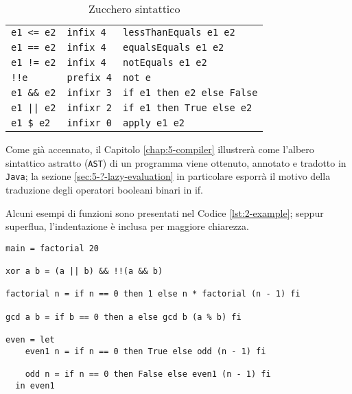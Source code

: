 \begin{table}[H]
\begin{center}
\begin{tabularx}{\textwidth}{|P{7em}@{\quad}P{7em}|X|}
            \texttt{e1 <= e2}            & \texttt{infix 4}  & \texttt{lessThanEquals e1 e2}     \\
            \texttt{e1 == e2}            & \texttt{infix 4}  & \texttt{equalsEquals e1 e2}       \\
            \texttt{e1 != e2}            & \texttt{infix 4}  & \texttt{notEquals e1 e2}          \\
            \texttt{!!e}                 & \texttt{prefix 4} & \texttt{not e}                    \\
            \texttt{e1 \&\& e2}          & \texttt{infixr 3} & \texttt{if e1 then e2 else False} \\
            \texttt{e1 || e2}            & \texttt{infixr 2} & \texttt{if e1 then True else e2}  \\
            \texttt{e1 \$ e2}            & \texttt{infixr 0} & \texttt{apply e1 e2}              \\
            \hline
        \end{tabularx}
    \end{center}
    \caption{Zucchero sintattico}
    \label{tab:2-sugar}
\end{table}

\newpage

\noindent Come già accennato, il Capitolo \ref{chap:5-compiler} illustrerà come l'albero sintattico astratto (\texttt{AST})
di un programma viene ottenuto, annotato e tradotto in \texttt{Java}; la sezione \ref{sec:5-?-lazy-evaluation}
in particolare esporrà il motivo della traduzione degli operatori booleani binari in if.

\noindent Alcuni esempi di funzioni sono presentati nel Codice \ref{lst:2-example};
seppur superflua, l'indentazione è inclusa per maggiore chiarezza.

\vspace{4mm}
\begin{lstlisting}[caption={Esempio di programma}, style=funxCode, label={lst:2-example}]
main = factorial 20

xor a b = (a || b) && !!(a && b)

factorial n = if n == 0 then 1 else n * factorial (n - 1) fi

gcd a b = if b == 0 then a else gcd b (a % b) fi

even = let
    even1 n = if n == 0 then True else odd (n - 1) fi

    odd n = if n == 0 then False else even1 (n - 1) fi
  in even1
\end{lstlisting}